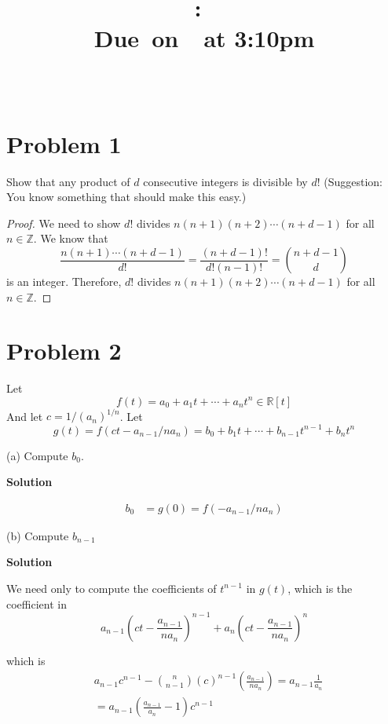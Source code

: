 \documentclass{article}
\title{
    \vspace{2in}
    \textmd{\textbf{\hmwkClass:\ \hmwkTitle}}\\
    \normalsize\vspace{0.1in}\small{Due\ on\ \hmwkDueDate\ at 3:10pm}\\
    \vspace{0.1in}\large{\textit{\hmwkClassInstructor\ \hmwkClassTime}}
    \vspace{3in}
}
\author{\hmwkAuthorName}
\date{}
\newcommand{\solution}{\textbf{\large Solution}}
\begin{document}
\maketitle

\pagebreak

\section{Problem 1}

Show that any product of $d$ consecutive integers is divisible by $d!$
(Suggestion:  You know something that should make this easy.)

\begin{proof}
    We need to show $d!$ divides $n(n+1)(n+2)\cdots(n+d-1)$ for all $n\in\mathbb{Z}$.
    We know that 
    \begin{equation*}
        \frac{n(n+1)\cdots (n+d-1)}{d!} = \frac{(n+d-1)!}{d!(n-1)!} = \binom{n+d-1}{d}
    \end{equation*}
    is an integer. Therefore, $d!$ divides $n(n+1)(n+2)\cdots(n+d-1)$ for all $n\in\mathbb{Z}$.
\end{proof}

\section{Problem 2}
Let
\begin{equation}
    f(t) = a_0 + a_1t + \cdots + a_nt^n \in \mathbb{R}[t]
\end{equation}
And let $c=1/(a_n)^{1/n}$.
Let
\begin{equation}
    g(t) = f(ct - a_{n-1}/na_n) = b_0 + b_1t + \cdots + b_{n-1}t^{n-1} + b_nt^n
\end{equation}

(a) Compute $b_0$. 

\solution

\begin{align*}
    b_0 &= g(0) = f(-a_{n-1}/na_n)
\end{align*}

(b) Compute $b_{n-1}$

\solution

We need only to compute the coefficients of $t^{n-1}$ in $g(t)$, which is the coefficient in 
\begin{equation}
    a_{n-1}\left(ct-\frac{a_{n-1}}{na_n}\right)^{n-1} + a_n\left(ct-\frac{a_{n-1}}{na_n}\right)^n
\end{equation}

which is
\begin{align*}
    &a_{n-1}c^{n-1} - \binom{n}{n-1}(c)^{n-1}\left(\frac{a_{n-1}}{na_n}\right)
    = a_{n-1}\frac{1}{a_n} \\
    &= a_{n-1}\left(\frac{a_{n-1}}{a_n} - 1\right)c^{n-1}
\end{align*}
\end{document}
